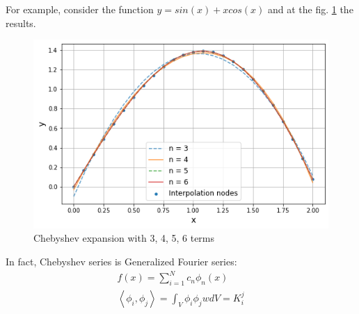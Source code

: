 For example, consider the function $y = sin(x) + x cos(x)$ and at the fig. \ref{fig:chebyshev_expansion} the results. 
\begin{figure}
	\centering
	\includegraphics[width=\textwidth]{images/chapter2/chebyshev_series.png}
	\caption{Chebyshev expansion with 3, 4, 5, 6 terms }
	\label{fig:chebyshev_expansion}
\end{figure}
In fact, Chebyshev series is Generalized Fourier series: 
\begin{equation*}
	\begin{multlined}
		f(x) = \sum_{i = 1}^{N} c_n \phi_n(x) \\
		\left < \phi_i, \phi_j \right > = \int_{V} \phi_i \phi_j w dV = K_i^j
	\end{multlined}
\end{equation*}
